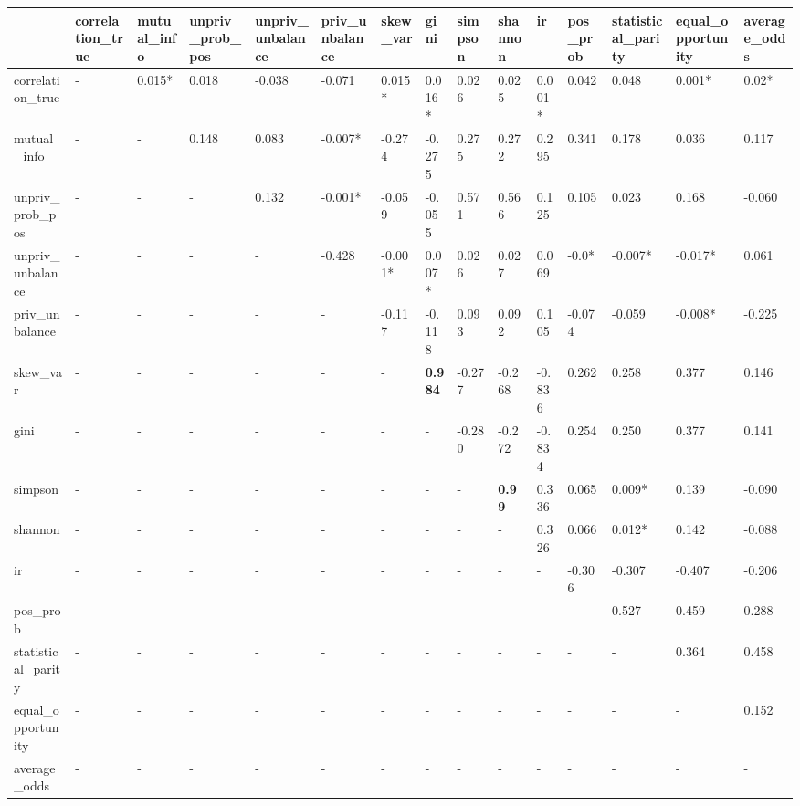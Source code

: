\begin{tabular}{lllllllllllllll}
\toprule
 & correlation_true & mutual_info & unpriv_prob_pos & unpriv_unbalance & priv_unbalance & skew_var & gini & simpson & shannon & ir & pos_prob & statistical_parity & equal_opportunity & average_odds \\
\midrule
correlation_true & - & 0.015* & 0.018 & -0.038 & -0.071 & 0.015* & 0.016* & 0.026 & 0.025 & 0.001* & 0.042 & 0.048 & 0.001* & 0.02* \\
mutual_info & - & - & 0.148 & 0.083 & -0.007* & -0.274 & -0.275 & 0.275 & 0.272 & 0.295 & 0.341 & 0.178 & 0.036 & 0.117 \\
unpriv_prob_pos & - & - & - & 0.132 & -0.001* & -0.059 & -0.055 & 0.571 & 0.566 & 0.125 & 0.105 & 0.023 & 0.168 & -0.060 \\
unpriv_unbalance & - & - & - & - & -0.428 & -0.001* & 0.007* & 0.026 & 0.027 & 0.069 & -0.0* & -0.007* & -0.017* & 0.061 \\
priv_unbalance & - & - & - & - & - & -0.117 & -0.118 & 0.093 & 0.092 & 0.105 & -0.074 & -0.059 & -0.008* & -0.225 \\
skew_var & - & - & - & - & - & - & \cellcolor{black!25}\textbf{0.984} & -0.277 & -0.268 & -0.836 & 0.262 & 0.258 & 0.377 & 0.146 \\
gini & - & - & - & - & - & - & - & -0.280 & -0.272 & -0.834 & 0.254 & 0.250 & 0.377 & 0.141 \\
simpson & - & - & - & - & - & - & - & - & \cellcolor{black!25}\textbf{0.99} & 0.336 & 0.065 & 0.009* & 0.139 & -0.090 \\
shannon & - & - & - & - & - & - & - & - & - & 0.326 & 0.066 & 0.012* & 0.142 & -0.088 \\
ir & - & - & - & - & - & - & - & - & - & - & -0.306 & -0.307 & -0.407 & -0.206 \\
pos_prob & - & - & - & - & - & - & - & - & - & - & - & 0.527 & 0.459 & 0.288 \\
statistical_parity & - & - & - & - & - & - & - & - & - & - & - & - & 0.364 & 0.458 \\
equal_opportunity & - & - & - & - & - & - & - & - & - & - & - & - & - & 0.152 \\
average_odds & - & - & - & - & - & - & - & - & - & - & - & - & - & - \\
\bottomrule
\end{tabular}

